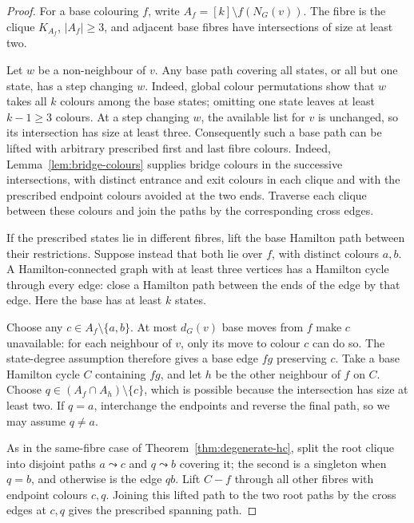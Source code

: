 \documentclass[11pt]{article}
\theoremstyle{remark}
\numberwithin{equation}{section}
\numberwithin{table}{section}
\begin{document}
\begin{proof}
For a base colouring $f$, write $A_f=[k]\setminus f(N_G(v))$.
The fibre is the clique $K_{A_f}$, $|A_f|\ge3$, and adjacent base
fibres have intersections of size at least two.

Let $w$ be a non-neighbour of $v$.  Any base path covering all states,
or all but one state, has a step changing $w$.  Indeed, global colour
permutations show that $w$ takes all $k$ colours among the base states;
omitting one state leaves at least $k-1\ge3$ colours.  At a step
changing $w$, the available list for $v$ is unchanged, so its
intersection has size at least three.  Consequently such a base path
can be lifted with arbitrary prescribed first and last fibre colours.
Indeed, Lemma~\ref{lem:bridge-colours} supplies bridge colours in the
successive intersections, with distinct entrance and exit colours in
each clique and with the prescribed endpoint colours avoided at the
two ends. Traverse each clique between these colours and join the
paths by the corresponding cross edges.

If the prescribed states lie in different fibres, lift the base
Hamilton path between their restrictions.  Suppose instead that both
lie over $f$, with distinct colours $a,b$.  A Hamilton-connected graph
with at least three vertices has a Hamilton cycle through every edge:
close a Hamilton path between the ends of the edge by that edge.
Here the base has at least $k$ states.

Choose any $c\in A_f\setminus\{a,b\}$. At most $d_G(v)$ base
moves from $f$ make $c$ unavailable: for each neighbour of $v$,
only its move to colour $c$ can do so. The state-degree assumption
therefore gives a base edge $fg$ preserving $c$. Take a base Hamilton
cycle $C$ containing $fg$, and let $h$ be the other neighbour of $f$
on $C$. Choose $q\in(A_f\cap A_h)\setminus\{c\}$, which is possible
because the intersection has size at least two. If $q=a$, interchange
the endpoints and reverse the final path, so we may assume $q\ne a$.

As in the same-fibre case of Theorem~\ref{thm:degenerate-hc}, split
the root clique into disjoint paths $a\leadsto c$ and $q\leadsto b$
covering it; the second is a singleton when $q=b$, and otherwise is
the edge $qb$. Lift $C-f$ through all other fibres with endpoint
colours $c,q$. Joining this lifted path to the two root paths by the
cross edges at $c,q$ gives the prescribed spanning path.

\end{proof}
\end{document}
